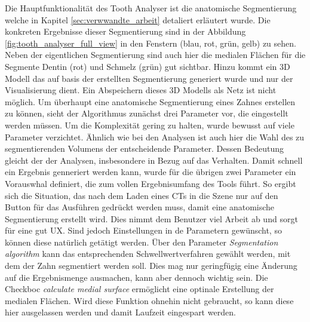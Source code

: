 Die Hauptfunktionalität des Tooth Analyser ist die anatomische Segmentierung welche
in Kapitel \ref{sec:verwwandte_arbeit} detaliert erläutert wurde. Die konkreten
Ergebnisse dieser Segmentierung sind in der Abbildung
\ref{fig:tooth_analyser_full_view} in den Fenstern (blau, rot, grün, gelb) zu sehen.
Neben der eigentlichen Segmentierung sind auch hier die medialen Flächen für die
Segmente Dentin (rot) und Schmelz (grün) gut sichtbar. Hinzu kommt ein \ac{3D}
Modell das auf basis der erstellten Segmentierung generiert wurde und nur der
Visualisierung dient. Ein Abspeichern dieses 3D Modells als Netz ist nicht möglich.
Um überhaupt eine anatomische Segmentierung eines Zahnes erstellen zu können, sieht
der Algorithmus zunächst drei Parameter vor, die eingestellt werden müssen. Um die
Komplexität gering zu halten, wurde bewusst auf viele Parameter verzichtet. Ähnlich
wie bei den Analysen ist auch hier die Wahl des zu segmentierenden Volumens der entscheidende
Parameter. Dessen Bedeutung gleicht der der Analysen, insbesondere in Bezug auf das
Verhalten. Damit schnell ein Ergebnis genneriert werden kann, wurde für die übrigen
zwei Parameter ein Vorauswhal definiert, die zum vollen Ergebnisumfang des Tools
führt. So ergibt sich die Situation, das nach dem Laden eines \ac{CT}s in die
Szene nur auf den Button für das Ausführen gedrückt werden muss, damit eine anatomische
Segmentierung erstellt wird. Dies nimmt dem Benutzer viel Arbeit ab und sorgt
für eine gut \ac{UX}. Sind jedoch Einstellungen in de Parametern gewünscht, so können
diese natürlich getätigt werden. Über den Parameter \textit{Segmentation
algorithm} kann das entsprechenden Schwellwertverfahren gewählt werden, mit dem
der Zahn segmentiert werden soll. Dies mag nur geringfügig eine Änderung auf die
Ergebnismenge ausmachen, kann aber dennoch wichtig sein. Die Checkboc \textit{calculate
medial surface} ermöglicht eine optinale Erstellung der medialen Flächen. Wird diese
Funktion ohnehin nicht gebraucht, so kann diese hier ausgelassen werden und
damit Laufzeit eingespart werden.

